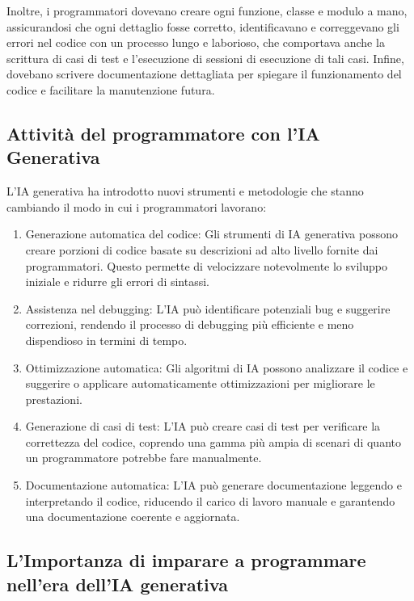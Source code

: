 \documentclass[
  letterpaper,
  DIV=11,
  numbers=noendperiod]{scrreprt}
\providecommand{\tightlist}{%
  \setlength{\itemsep}{0pt}\setlength{\parskip}{0pt}}\usepackage{longtable,booktabs,array}
\begin{document}
Inoltre, i programmatori dovevano creare ogni funzione, classe e modulo
a mano, assicurandosi che ogni dettaglio fosse corretto, identificavano
e correggevano gli errori nel codice con un processo lungo e laborioso,
che comportava anche la scrittura di casi di test e l'esecuzione di
sessioni di esecuzione di tali casi. Infine, dovebano scrivere
documentazione dettagliata per spiegare il funzionamento del codice e
facilitare la manutenzione futura.

\subsection{Attività del programmatore con l'IA
Generativa}\label{attivituxe0-del-programmatore-con-lia-generativa}

L'IA generativa ha introdotto nuovi strumenti e metodologie che stanno
cambiando il modo in cui i programmatori lavorano:

\begin{enumerate}
\def\labelenumi{\arabic{enumi}.}
\tightlist
\item
  Generazione automatica del codice: Gli strumenti di IA generativa
  possono creare porzioni di codice basate su descrizioni ad alto
  livello fornite dai programmatori. Questo permette di velocizzare
  notevolmente lo sviluppo iniziale e ridurre gli errori di sintassi.
\item
  Assistenza nel debugging: L'IA può identificare potenziali bug e
  suggerire correzioni, rendendo il processo di debugging più efficiente
  e meno dispendioso in termini di tempo.
\item
  Ottimizzazione automatica: Gli algoritmi di IA possono analizzare il
  codice e suggerire o applicare automaticamente ottimizzazioni per
  migliorare le prestazioni.
\item
  Generazione di casi di test: L'IA può creare casi di test per
  verificare la correttezza del codice, coprendo una gamma più ampia di
  scenari di quanto un programmatore potrebbe fare manualmente.
\item
  Documentazione automatica: L'IA può generare documentazione leggendo e
  interpretando il codice, riducendo il carico di lavoro manuale e
  garantendo una documentazione coerente e aggiornata.
\end{enumerate}

\subsection{L'Importanza di imparare a programmare nell'era dell'IA
generativa}\label{limportanza-di-imparare-a-programmare-nellera-dellia-generativa}
\end{document}
